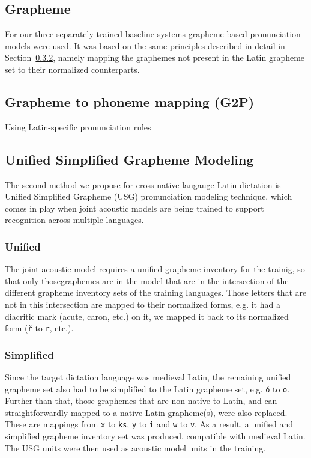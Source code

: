 \documentclass[runningheads,a4paper]{llncs}
\begin{document}
\subsection{Grapheme}
For our three separately trained baseline systems grapheme-based pronunciation models were used.
It was based on the same principles described in detail in Section~\ref{simplified}, namely mapping the graphemes not present in the Latin grapheme set to their normalized counterparts.
\subsection{Grapheme to phoneme mapping (G2P)}\label{g2p}
Using Latin-specific pronunciation rules  
\subsection{Unified Simplified Grapheme Modeling}\label{usg}
The second method we propose for cross-native-langauge Latin dictation is Unified Simplified Grapheme (USG) pronunciation modeling technique, which comes in play when joint acoustic models are being trained to support recognition across multiple languages.
\subsubsection{Unified}
The joint acoustic model requires a unified grapheme inventory for the trainig, so that only thosegraphemes are in the model that are in the intersection of the different grapheme inventory sets of the training languages.
Those letters that are not in this intersection are mapped to their normalized forms, e.g. it had a diacritic mark (acute, caron, etc.) on it, we mapped it back to its normalized form (\texttt{\v{r}} to \texttt{r}, etc.).
\subsubsection{Simplified}\label{simplified}
Since the target dictation language was medieval Latin, the remaining unified grapheme set also had to be simplified to the Latin grapheme set, e.g. \texttt{\'{o}} to \texttt{o}.
Further than that, those graphemes that are non-native to Latin, and can straightforwardly mapped to a native Latin grapheme(s), were also replaced.
These are mappings from \texttt{x} to \texttt{ks}, \texttt{y} to \texttt{i} and \texttt{w} to \texttt{v}.
As a result, a unified and simplified grapheme inventory set was produced, compatible with medieval Latin.
The USG units were then used as acoustic model units in the training.
\end{document}
